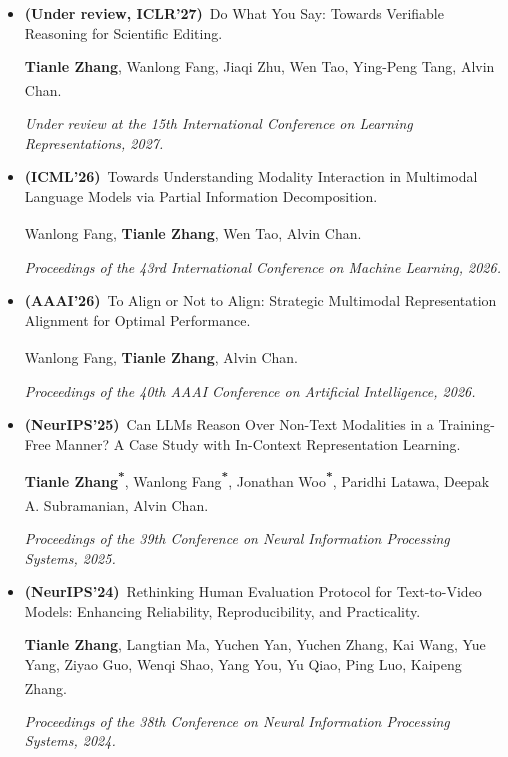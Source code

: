 \documentclass[10pt,a4paper]{article}
\newcommand{\me}[1]{\textbf{#1}}
\newcommand{\eq}{\textsuperscript{\textbf{*}}}
\newcommand{\corr}{\textsuperscript{\textbf{\dag}}}
\begin{document}
\begin{itemize}[leftmargin=1.4em, itemsep=4pt]

  \item \textbf{(Under review, ICLR'27)}~Do What You Say: Towards Verifiable Reasoning for Scientific Editing.\par
        \me{Tianle Zhang}, Wanlong Fang, Jiaqi Zhu, Wen Tao, Ying-Peng Tang, Alvin Chan\corr.\par
        \textit{Under review at the 15th International Conference on Learning Representations, 2027.}

  \item \textbf{(ICML'26)}~Towards Understanding Modality Interaction in Multimodal Language Models via Partial Information Decomposition.\par
        Wanlong Fang, \me{Tianle Zhang}, Wen Tao, Alvin Chan\corr.\par
        \textit{Proceedings of the 43rd International Conference on Machine Learning, 2026.}

  \item \textbf{(AAAI'26)}~To Align or Not to Align: Strategic Multimodal Representation Alignment for Optimal Performance.\par
        Wanlong Fang, \me{Tianle Zhang}, Alvin Chan\corr.\par
        \textit{Proceedings of the 40th AAAI Conference on Artificial Intelligence, 2026.}

  \item \textbf{(NeurIPS'25)}~Can LLMs Reason Over Non-Text Modalities in a Training-Free Manner? A Case Study with In-Context Representation Learning.\par
        \me{Tianle Zhang}\eq, Wanlong Fang\eq, Jonathan Woo\eq, Paridhi Latawa, Deepak A. Subramanian, Alvin Chan\corr.\par
        \textit{Proceedings of the 39th Conference on Neural Information Processing Systems, 2025.}

  \item \textbf{(NeurIPS'24)}~Rethinking Human Evaluation Protocol for Text-to-Video Models: Enhancing Reliability, Reproducibility, and Practicality.\par
        \me{Tianle Zhang}, Langtian Ma, Yuchen Yan, Yuchen Zhang, Kai Wang, Yue Yang, Ziyao Guo, Wenqi Shao, Yang You, Yu Qiao, Ping Luo, Kaipeng Zhang\corr.\par
        \textit{Proceedings of the 38th Conference on Neural Information Processing Systems, 2024.}


\end{itemize}
\end{document}
